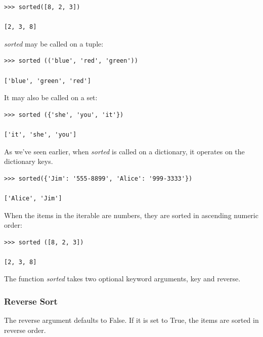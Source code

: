 \documentclass{article}
\begin{document}
\begin{lstlisting}
>>> sorted([8, 2, 3])

[2, 3, 8]
\end{lstlisting}

\textit{sorted} may be called on a tuple:

\begin{lstlisting}
>>> sorted (('blue', 'red', 'green'))

['blue', 'green', 'red']
\end{lstlisting}

It may also be called on a set:

\begin{lstlisting}
>>> sorted ({'she', 'you', 'it'})

['it', 'she', 'you']
\end{lstlisting}

As we've seen earlier, when \textit{sorted} is  called on a dictionary,  it operates on the dictionary keys.

\begin{lstlisting}
>>> sorted({'Jim': '555-8899', 'Alice': '999-3333'})

['Alice', 'Jim']
\end{lstlisting}

When the items in the iterable are numbers, they are sorted in ascending numeric order:

\begin{lstlisting}
>>> sorted ([8, 2, 3])

[2, 3, 8]
\end{lstlisting}

The function \textit{sorted}  takes two optional keyword arguments, key and reverse.

\subsubsection{Reverse Sort}

The reverse argument defaults to False. If it is set to True,  the items are sorted in reverse order. 
\end{document}
